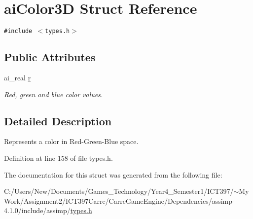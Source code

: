 \hypertarget{structai_color3_d}{
\section{aiColor3D Struct Reference}
\label{structai_color3_d}
}
{\tt \#include $<$types.h$>$}

\subsection*{Public Attributes}
\begin{CompactItemize}
\item 
\hypertarget{structai_color3_d_9244c589dc4c8d95e4107951f2a9a386}{
ai\_\-real \hyperlink{structai_color3_d_9244c589dc4c8d95e4107951f2a9a386}{r}}
\label{structai_color3_d_9244c589dc4c8d95e4107951f2a9a386}

\begin{CompactList}\small\item\em Red, green and blue color values. \item\end{CompactList}\end{CompactItemize}


\subsection{Detailed Description}
Represents a color in Red-Green-Blue space. 

Definition at line 158 of file types.h.

The documentation for this struct was generated from the following file:\begin{CompactItemize}
\item 
C:/Users/New/Documents/Games\_\-Technology/Year4\_\-Semester1/ICT397/$\sim$My Work/Assignment2/ICT397Carre/CarreGameEngine/Dependencies/assimp-4.1.0/include/assimp/\hyperlink{types_8h}{types.h}\end{CompactItemize}
